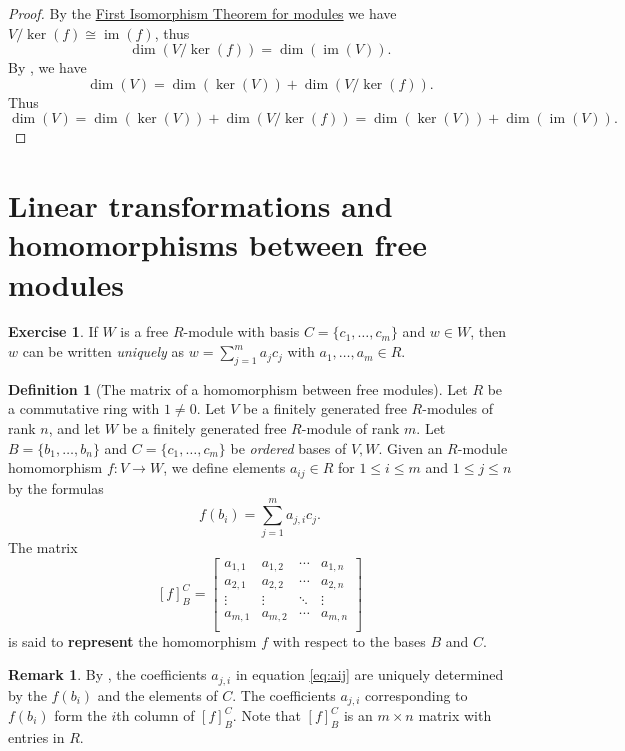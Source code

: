 \documentclass[12pt]{report}
\numberwithin{equation}{section}
\numberwithin{theorem}{chapter}
\theoremstyle{definition}
\newtheorem{definition}[theorem]{Definition}
\newtheorem{exercise}{Exercise}
\newtheorem*{basic properties}{Basic Properties}
\newtheorem*{Important Remark}{Important Remark}
\newtheorem{remark}[theorem]{Remark}
\newcommand{\df}[1]{{\bf #1}\index{#1}}
\renewcommand{\ker}{\operatorname{ker}}
\DeclareMathOperator{\im}{im}
\begin{document}
\begin{proof}
 By the \hyperref[first iso thm]{First Isomorphism Theorem for modules} we have $V/\ker(f)\cong\im(f)$, thus 
 $$\dim\left(V/\ker(f)\right)=\dim(\im(V)).$$ 
 By , we have 
 $$\dim(V)=\dim(\ker(V))+\dim\left(V/\ker(f)\right).$$
 Thus
$$\dim(V)=\dim(\ker(V))+\dim\left(V/\ker(f)\right) = \dim(\ker(V)) + \dim(\im(V)).$$ 
\end{proof}




 
\section{Linear transformations and homomorphisms between free modules}


\begin{exercise}\label{lem:uniqueaij}
If $W$ is a free $R$-module with basis $C=\{c_1, \dots, c_m\}$ and $w\in W$, then $w$ can be written {\em uniquely} as $w=\sum_{j=1}^m a_j c_j$ with $a_1,\ldots, a_m\in R$.
\end{exercise}


\begin{definition}[The matrix of a homomorphism between free modules] 
Let $R$ be a commutative ring with $1\neq 0$.
Let $V$ be a finitely generated free $R$-modules of rank $n$, and let $W$ be a finitely generated free $R$-module of rank $m$. Let $B=\{b_1, \dots, b_n\}$ and $C=\{c_1, \dots, c_m\}$ be {\em ordered} bases of $V,W$. 
Given an $R$-module homomorphism $f: V \to W$, we define elements $a_{ij}\in R$ for $1 \leqslant i \leqslant m$ and $1 \leqslant j \leqslant n$ by the formulas
\begin{equation}\label{eq:aij}
f(b_i) = \sum_{j=1}^m a_{j,i} c_j. 
\end{equation}
The matrix
$$[f]_B^C= 
\begin{bmatrix}
a_{1,1} & a_{1,2} & \cdots & a_{1,n} \\
a_{2,1} & a_{2,2} & \cdots & a_{2,n} \\
\vdots & \vdots & \ddots & \vdots \\
a_{m,1} & a_{m,2} & \cdots & a_{m,n} \\
\end{bmatrix}$$
is said to \df{represent} the homomorphism $f$ with respect to the bases $B$ and $C$.
\end{definition}

\begin{remark}
By , the coefficients $a_{j,i}$ in equation \ref{eq:aij} are uniquely determined by the $f(b_i)$ and the elements of $C$. 
The coefficients $a_{j,i}$  corresponding to $f(b_i)$ form the $i$th column of $[f]_B^C$.
Note that $[f]_B^C$ is an $m\times n$ matrix with entries in $R$.
\end{remark}
\end{document}
